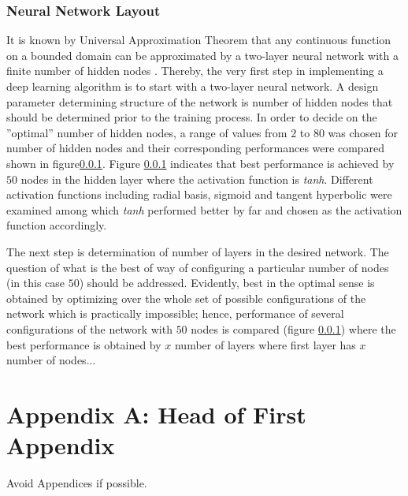 \documentclass[twocolumn,10pt]{asme2e}
\begin{document}
\subsubsection{Neural Network Layout}

It is known by Universal Approximation Theorem that any continuous function on a bounded domain can be approximated by a two-layer neural network with a finite number of hidden nodes \cite{universality}. Thereby, the very first step in implementing a deep learning algorithm is to start with a two-layer neural network. A design parameter determining structure of the network is number of hidden nodes that should be determined prior to the training process. In order to decide on the ''optimal'' number of hidden nodes, a range of values from $2$ to $80$ was chosen for number of hidden nodes and their corresponding performances were compared shown in figure\ref{}. Figure \ref{} indicates that best performance is achieved by $50$ nodes in the hidden layer where the activation function is \textit{tanh}. Different activation functions including radial basis, sigmoid and tangent hyperbolic were examined among which \textit{tanh} performed better by far and chosen as the activation function accordingly.  

The next step is determination of number of layers in the desired network. The question of what is the best of way of configuring a particular number of nodes (in this case $50$) should be addressed. Evidently, best in the optimal sense is obtained by optimizing over the whole set of possible configurations of the network which is practically impossible; hence, performance of several configurations of the network with $50$ nodes is compared (figure \ref{}) where the best performance is obtained by $x$ number of layers where first layer has $x$ number of nodes...

 





\appendix       %
\section*{Appendix A: Head of First Appendix}
Avoid Appendices if possible.
\end{document}
